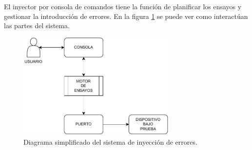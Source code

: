 El inyector por consola de comandos tiene la función de planificar los ensayos y gestionar la introducción de errores.
En la figura \ref{fig:sisesimple} se puede ver como interactúan las partes del sistema.

\begin{figure}[htbp]
	\centering
	\includegraphics[width=0.7\textwidth]{./Figures/sisesimple.pdf}
    \caption{Diagrama simplificado del sistema de inyección de errores.}
	\label{fig:sisesimple}
\end{figure}

